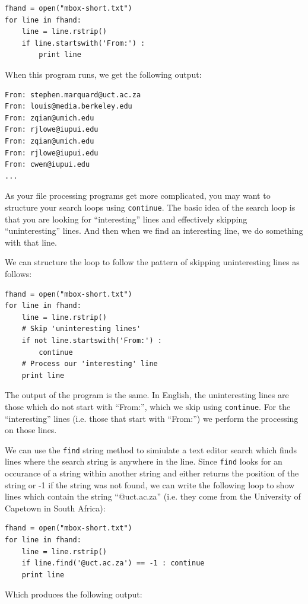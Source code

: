 \documentclass[10pt]{book}
\begin{document}
\beforeverb
\begin{verbatim}
fhand = open("mbox-short.txt")
for line in fhand:
    line = line.rstrip()
    if line.startswith('From:') :
        print line
\end{verbatim}
\afterverb
%
When this program runs, we get the following output:

\beforeverb
\begin{verbatim}
From: stephen.marquard@uct.ac.za
From: louis@media.berkeley.edu
From: zqian@umich.edu
From: rjlowe@iupui.edu
From: zqian@umich.edu
From: rjlowe@iupui.edu
From: cwen@iupui.edu
...
\end{verbatim}
\afterverb
%
As your file processing programs get more complicated, you may want 
to structure your search loops using {\tt continue}.  The basic idea 
of the search loop is that you are looking for ``interesting'' lines
and effectively skipping ``uninteresting'' lines.  And then when we
find an interesting line, we do something with that line.

We can structure the loop to follow the
pattern of skipping uninteresting lines as follows:

\beforeverb
\begin{verbatim}
fhand = open("mbox-short.txt")
for line in fhand:
    line = line.rstrip()
    # Skip 'uninteresting lines'
    if not line.startswith('From:') :
        continue
    # Process our 'interesting' line
    print line
\end{verbatim}
\afterverb
%
The output of the program is the same.  In English, the 
uninteresting lines are those which do not start 
with ``From:'', which we skip using {\tt continue}.
For the ``interesting'' lines (i.e. those that start with ``From:'')
we perform the processing on those lines.

We can use the {\tt find} string method to simiulate a text editor
search which finds lines where the search string is anywhere in the line.  
Since {\tt find} looks for an occurance of a string within another
string and either returns the position of the string or -1 if the string
was not found, we can write the following loop to show lines which
contain the string ``@uct.ac.za'' (i.e. they come from the University 
of Capetown in South Africa):

\beforeverb
\begin{verbatim}
fhand = open("mbox-short.txt")
for line in fhand:
    line = line.rstrip()
    if line.find('@uct.ac.za') == -1 : continue
    print line
\end{verbatim}
\afterverb
%
Which produces the following output:
\end{document}
